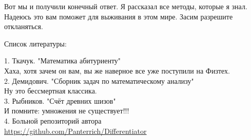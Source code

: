 \vspace{2cm}
Вот мы и получили конечный ответ. Я рассказал все методы, которые я знал. Надеюсь это вам поможет для выживания в этом мире. Засим разрешите откланяться.
 
\vspace{2cm}
 Список литературы:
 
 1. Ткачук. "Математика абитуриенту"    \\
   Хаха, хотя зачем он вам, вы же наверное все уже поступили на Физтех.
\\ 
 
 2. Демидович. "Сборник задач по математическому анализу" \\
 Ну это бессмертная классика.
\\ 
 
 3. Рыбников. "Счёт древних шизов" \\
 И помните: умножения не существует!!!
 \\
 
4. Больной репозиторий автора \\
 \href{https://github.com/Panterrich/Differentiator}{https://github.com/Panterrich/Differentiator}
